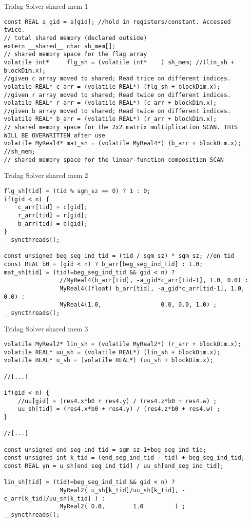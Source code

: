 \documentclass[xcolor=x11names,compress]{beamer}
\begin{document}
\begin{frame}[fragile]{Tridag Solver shared mem 1}
\begin{verbatim}
const REAL a_gid = a[gid]; //hold in registers/constant. Accessed twice.
// total shared memory (declared outside)
extern __shared__ char sh_mem[];
// shared memory space for the flag array
volatile int*     flg_sh = (volatile int*    ) sh_mem; //(lin_sh + blockDim.x);
//given c array moved to shared; Read trice on different indices.
volatile REAL* c_arr = (volatile REAL*) (flg_sh + blockDim.x);
//given r array moved to shared; Read twice on different indices.
volatile REAL* r_arr = (volatile REAL*) (c_arr + blockDim.x);
//given b array moved to shared; Read twice on different indices.
volatile REAL* b_arr = (volatile REAL*) (r_arr + blockDim.x);
// shared memory space for the 2x2 matrix multiplication SCAN. THIS WILL BE OVERWRITTEN after use
volatile MyReal4* mat_sh = (volatile MyReal4*) (b_arr + blockDim.x); //sh_mem;
// shared memory space for the linear-function composition SCAN    
\end{verbatim}
\end{frame}

\begin{frame}[fragile]{Tridag Solver shared mem 2}
\begin{verbatim}
flg_sh[tid] = (tid % sgm_sz == 0) ? 1 : 0;
if(gid < n) {
    c_arr[tid] = c[gid];
    r_arr[tid] = r[gid];
    b_arr[tid] = b[gid];
}
__syncthreads();

const unsigned beg_seg_ind_tid = (tid / sgm_sz) * sgm_sz; //on tid 
const REAL b0 = (gid < n) ? b_arr[beg_seg_ind_tid] : 1.0;
mat_sh[tid] = (tid!=beg_seg_ind_tid && gid < n) ?
                //MyReal4(b_arr[tid], -a_gid*c_arr[tid-1], 1.0, 0.0) :
                MyReal4((float) b_arr[tid], -a_gid*c_arr[tid-1], 1.0, 0.0) :
                MyReal4(1.0,                 0.0, 0.0, 1.0) ;
__syncthreads();
\end{verbatim}
\end{frame}

\begin{frame}[fragile]{Tridag Solver shared mem 3}
\begin{verbatim}
volatile MyReal2* lin_sh = (volatile MyReal2*) (r_arr + blockDim.x);
volatile REAL* uu_sh = (volatile REAL*) (lin_sh + blockDim.x);
volatile REAL* u_sh = (volatile REAL*) (uu_sh + blockDim.x);

//[...]

if(gid < n) {
    //uu[gid] = (res4.x*b0 + res4.y) / (res4.z*b0 + res4.w) ;
    uu_sh[tid] = (res4.x*b0 + res4.y) / (res4.z*b0 + res4.w) ;
}

//[...]

const unsigned end_seg_ind_tid = sgm_sz-1+beg_seg_ind_tid;
const unsigned int k_tid = (end_seg_ind_tid - tid) + beg_seg_ind_tid;  
const REAL yn = u_sh[end_seg_ind_tid] / uu_sh[end_seg_ind_tid];

lin_sh[tid] = (tid!=beg_seg_ind_tid && gid < n) ?
                MyReal2( u_sh[k_tid]/uu_sh[k_tid], -c_arr[k_tid]/uu_sh[k_tid] ) :
                MyReal2( 0.0,        1.0         ) ;
__syncthreads();
\end{verbatim}
\end{frame}
\end{document}

